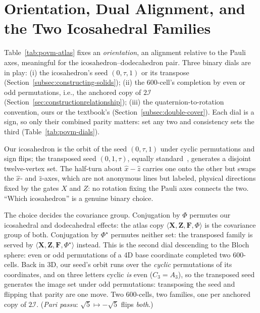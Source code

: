 \documentclass[11pt, oneside, openany]{scrbook}
\newcommand{\Igroup}{\mathcal{I}}  %
\newcommand{\TwoI}{2\Igroup}
\newcommand{\phig}{\tau} %
\begin{document}
\section{Orientation, Dual Alignment, and the Two Icosahedral Families} \label{sec:povm-atlas:families}

Table~\ref{tab:povm-atlas} fixes an \textit{orientation}, an alignment relative to the Pauli axes, meaningful for the icosahedron--dodecahedron pair. Three binary dials are in play: (i) the icosahedron's seed $(0, \phig, 1)$ or its transpose (Section~\ref{subsec:constructing-solids}); (ii) the 600-cell's completion by even or odd permutations, i.e., the anchored copy of $\TwoI$ (Section~\ref{sec:constructionrelationship}); (iii) the quaternion-to-rotation convention, ours or the textbook's (Section~\ref{subsec:double-cover}). Each dial is a sign, so only their combined parity matters: set any two and consistency sets the third (Table~\ref{tab:povm-dials}).

Our icosahedron is the orbit of the seed $(0, \phig, 1)$ under cyclic permutations and sign flips; the transposed seed $(0, 1, \phig)$, equally standard~\cite[Exercise~12.7]{waldron2018introductionfinitetight}, generates a disjoint twelve-vertex set. The half-turn about $\hat x - \hat z$ carries one onto the other but swaps the $\hat x$- and $\hat z$-axes, which are not anonymous lines but labeled, physical directions fixed by the gates $X$ and $Z$: no rotation fixing the Pauli axes connects the two. ``Which icosahedron'' is a genuine binary choice.

The choice decides the covariance group. Conjugation by $\Phi$ permutes our icosahedral and dodecahedral effects: the atlas copy $\langle \mathbf{X}, \mathbf{Z}, \mathbf{F}, \Phi \rangle$ is the covariance group of both. Conjugation by $\Phi^\star$ permutes neither set: the transposed family is served by $\langle \mathbf{X}, \mathbf{Z}, \mathbf{F}, \Phi^\star \rangle$ instead. This is the second dial descending to the Bloch sphere: even or odd permutations of a 4D base coordinate completed two 600-cells. Back in 3D, our seed's orbit runs over the \textit{cyclic} permutations of its coordinates, and on three letters cyclic \textit{is} even ($C_3 = A_3$), so the transposed seed generates the image set under odd permutations: transposing the seed and flipping that parity are one move. Two 600-cells, two families, one per anchored copy of $\TwoI$. (\textit{Pari passu}: $\sqrt{5} \mapsto -\sqrt{5}$ flips \textit{both}.)
\end{document}
